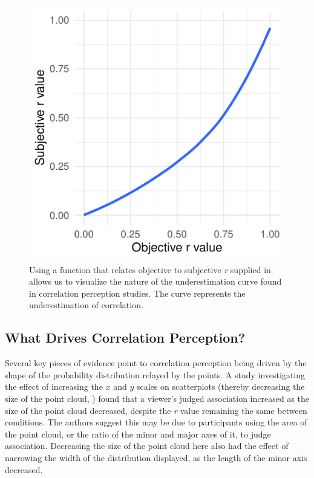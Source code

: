 \documentclass[preprint, 3p,
authoryear]{elsarticle} %
\begin{document}
\begin{figure}

\includegraphics{contrast_and_scatterplots_files/figure-latex/underestimation-curve-1} \hfill{}

\caption{\label{underestimation-curve}Using a function that relates objective to subjective \textit{r} supplied in \cite{rensink_2017} allows us to visualize the nature of the underestimation curve found in correlation perception studies. The curve represents the underestimation of correlation.}\label{fig:underestimation-curve}
\end{figure}

\hypertarget{what-drives-correlation-perception}{%
\subsection{What Drives Correlation
Perception?}\label{what-drives-correlation-perception}}

Several key pieces of evidence point to correlation perception being
driven by the shape of the probability distribution relayed by the
points. A study investigating the effect of increasing the \(x\) and
\(y\) scales on scatterplots (thereby decreasing the size of the point
cloud, \citealp{cleveland_1982}) found that a viewer's judged
association increased as the size of the point cloud decreased, despite
the \emph{r} value remaining the same between conditions. The authors
suggest this may be due to participants using the area of the point
cloud, or the ratio of the minor and major axes of it, to judge
association. Decreasing the size of the point cloud here also had the
effect of narrowing the width of the distribution displayed, as the
length of the minor axis decreased.
\end{document}
